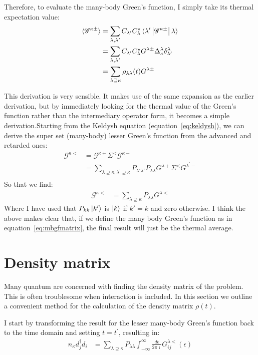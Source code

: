 Therefore, to evaluate the many-body Green's function, I simply take its thermal expectation value:
\begin{align*}
\braket{ \mathscr{G}^{\kappa\pm}} &= \sum_{\lambda,\lambda^\prime}C_{\lambda^\prime}C_\lambda^\star \braket{\lambda^\prime \left| \mathscr{G}^{\kappa\pm} \right| \lambda } \\
&= \sum_{\lambda,\lambda^\prime} C_{\lambda^\prime}C_\lambda^\star  G^{\lambda\pm} \Delta^\lambda_\kappa \delta^\lambda_{\lambda^\prime}\\
&= \sum_{\lambda \supseteq \kappa} \rho_{\lambda\lambda}(t) G^{\lambda\pm} 
\end{align*}

This derivation is very sensible. It makes use of the same expansion as the earlier derivation, but by immediately looking for the thermal value of the Green's function rather than the intermediary operator form, it becomes a simple derivation.Starting from the Keldysh equation (equation~\ref{eq:keldysh}), we can derive the super set (many-body) lesser Green's function from the advanced and retarded ones:
\begin{align*}
    \mathscr{G}^{\kappa<} &= \mathscr{G}^{\kappa+} \Sigma^< \mathscr{G}^{\kappa-} \\
    &= \sum_{\lambda\supseteq\kappa, \lambda^\prime \supseteq\kappa}P_{\lambda'\lambda'} P_{\lambda\lambda} G^{\lambda+} \Sigma^< G^{\lambda^\prime-} \\
\end{align*}
So that we find:
\begin{align}
    \mathscr{G}^{\kappa<} &= \sum_{\lambda\supseteq\kappa} P_{\lambda\lambda} G^{\lambda<} \label{eq:mblessergf}
\end{align}
Where I have used that $P_{kk} \ket{k'}$ is $\ket{k}$ if $k'=k$ and zero otherwise. I think the above makes clear that, if we define the many body Green's function as in equation~\ref{eq:mbgfmatrix}, the final result will just be the thermal average. 

\section{Density matrix}
Many quantum are concerned with finding the density matrix of the problem. This is often troublesome when interaction is included. In this section we outline a convenient method for the calculation of the density matrix $\rho(t)$.

I start by transforming the result for the lesser many-body Green's function back to the time domain and setting $t=t^\prime$, resulting in:
\begin{align*}
n_\kappa d_j^\dagger d_i &= \sum_{\lambda\supseteq\kappa} P_{\lambda\lambda} \int^\infty_{-\infty} \frac{d\epsilon}{2\pi\imath} G^{\lambda<}_{ij}(\epsilon)
\end{align*}

